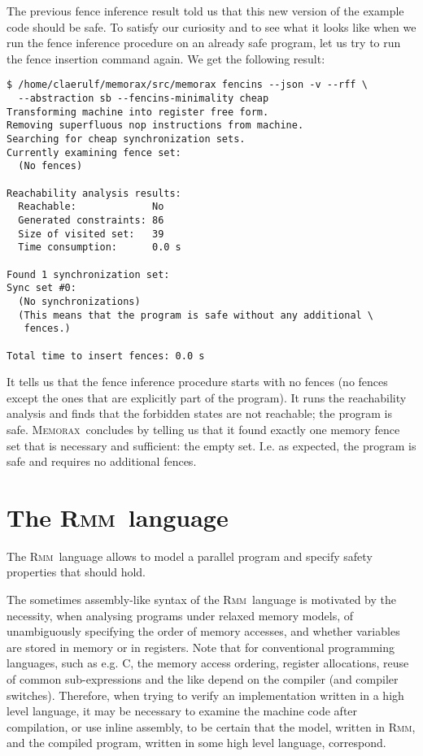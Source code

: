 \documentclass[a4paper]{article}
\newcommand{\memorax}{\textsc{Memorax}}
\newcommand{\rmm}{\textsc{Rmm}}
\begin{document}
The previous fence inference result told us that this new version of
the example code should be safe. To satisfy our curiosity and to see
what it looks like when we run the fence inference procedure on an
already safe program, let us try to run the fence insertion command
again. We get the following result:

\noindent
\begin{verbatim}
$ /home/claerulf/memorax/src/memorax fencins --json -v --rff \
  --abstraction sb --fencins-minimality cheap
Transforming machine into register free form.
Removing superfluous nop instructions from machine.
Searching for cheap synchronization sets.
Currently examining fence set:
  (No fences)

Reachability analysis results:
  Reachable:             No
  Generated constraints: 86
  Size of visited set:   39
  Time consumption:      0.0 s

Found 1 synchronization set:
Sync set #0:
  (No synchronizations)
  (This means that the program is safe without any additional \
   fences.)

Total time to insert fences: 0.0 s
\end{verbatim}

It tells us that the fence inference procedure starts with no fences
(no fences except the ones that are explicitly part of the
program). It runs the reachability analysis and finds that the
forbidden states are not reachable; the program is safe. \memorax\
concludes by telling us that it found exactly one memory fence set
that is necessary and sufficient: the empty set. I.e. as expected, the
program is safe and requires no additional fences.

\section{The \rmm\ language}\label{sec:rmm:language}

The \rmm\ language allows to model a parallel program and specify safety
properties that should hold.

The sometimes assembly-like syntax of the \rmm\ language is motivated by
the necessity, when analysing programs under relaxed memory models, of
unambiguously specifying the order of memory accesses, and whether
variables are stored in memory or in registers. Note that for
conventional programming languages, such as e.g. C, the memory access
ordering, register allocations, reuse of common sub-expressions and the
like depend on the compiler (and compiler switches). Therefore, when
trying to verify an implementation written in a high level language,
it may be necessary to examine the machine code after compilation, or
use inline assembly, to be certain that the model, written in \rmm, and
the compiled program, written in some high level language, correspond.
\end{document}
